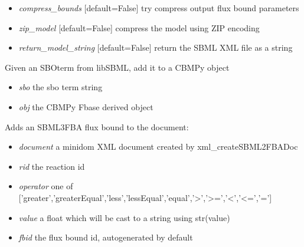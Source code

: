 \documentclass[a4paper,11pt,english]{sphinxmanual}
\begin{document}
\begin{fulllineitems}
\begin{itemize}
\begin{itemize}
\item {} 
\emph{compress\_bounds} {[}default=False{]} try compress output flux bound parameters

\item {} 
\emph{zip\_model} {[}default=False{]} compress the model using ZIP encoding

\item {} 
\emph{return\_model\_string} {[}default=False{]} return the SBML XML file as a string

\end{itemize}

\end{itemize}

\end{fulllineitems}


\begin{fulllineitems}
\label{modules_doc:cbmpy.CBXML.setCBSBOterm}
Given an SBOterm from libSBML, add it to a CBMPy object
\begin{itemize}
\item {} 
\emph{sbo} the sbo term string

\item {} 
\emph{obj} the CBMPy Fbase derived object

\end{itemize}

\end{fulllineitems}


\begin{fulllineitems}
\label{modules_doc:cbmpy.CBXML.xml_addSBML2FBAFluxBound}
Adds an SBML3FBA flux bound to the document:
\begin{itemize}
\item {} 
\emph{document} a minidom XML document created by xml\_createSBML2FBADoc

\item {} 
\emph{rid} the reaction id

\item {} 
\emph{operator} one of {[}'greater','greaterEqual','less','lessEqual','equal','\textgreater{}','\textgreater{}=','\textless{}','\textless{}=','='{]}

\item {} 
\emph{value} a float which will be cast to a string using str(value)

\item {} 
\emph{fbid} the flux bound id, autogenerated by default

\end{itemize}

\end{fulllineitems}
\end{document}
